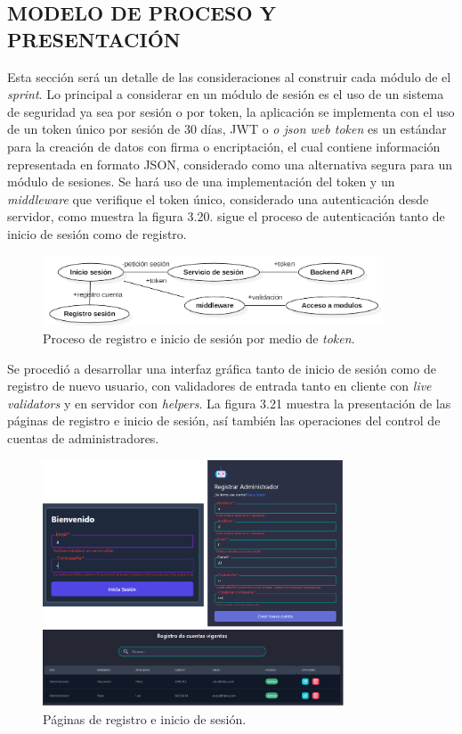 \documentclass[letter, openright, 12pt]{book}
\begin{document}
\subsection{MODELO DE PROCESO Y PRESENTACIÓN}

Esta sección será un detalle de las consideraciones al construir cada módulo de el {\it sprint}. Lo principal a considerar en un módulo de sesión es el uso de un sistema de seguridad ya sea por sesión o por token, la aplicación se implementa con el uso de un token único por sesión de 30 días, JWT o { \it o json web token} es un estándar para la creación de datos con firma o encriptación, el cual contiene información representada en formato JSON, considerado como una alternativa segura para un módulo de sesiones. Se hará uso de una implementación del token y un {\it middleware } que verifique el token único, considerado una autenticación desde servidor, como muestra la figura 3.20. sigue el proceso de autenticación tanto de inicio de sesión como de registro. 


\begin{figure}[H]
\centering
\includegraphics[width=0.9\textwidth]{figura3_20}
 \caption{Proceso de registro e inicio de sesión por medio de {\it token}. }
\label{fig:figura3_20}
\end{figure}

Se procedió a desarrollar una interfaz gráfica tanto de inicio de sesión como de registro de nuevo usuario, con validadores de entrada tanto en cliente con {\it live validators} y en servidor con {\it helpers}. La figura 3.21 muestra la presentación de las páginas de registro e inicio de sesión, así también las operaciones del control de cuentas de administradores. 


\begin{figure}[H]
\centering
\includegraphics[width=0.8\textwidth]{figura3_21}
 \caption{Páginas de registro e inicio de sesión. }
\label{fig:figura3_21}
\end{figure}
\end{document}
